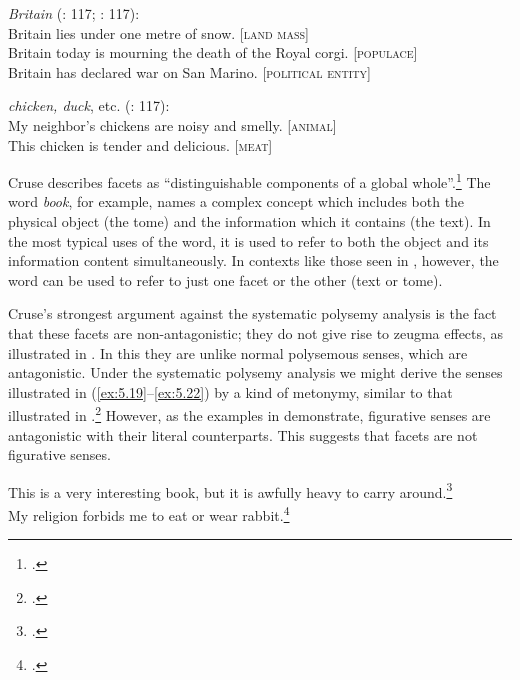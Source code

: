 \ea \label{ex:5.21} \textit{Britain} (\citealt{Cruse2000}: 117; \citealt{CroftCruse2004}: 117):\\
\ea Britain lies under one metre of snow.                    \hfill [\textsc{land mass}] \\
\ex Britain today is mourning the death of the Royal corgi.  \hfill [\textsc{populace}] \\
\ex Britain has declared war on San Marino.                  \hfill [\textsc{political entity}] \\
                       \z
\z

\ea \label{ex:5.22}
\textit{chicken, duck}, etc. (\citealt{CroftCruse2004}: 117):\\
\ea My neighbor’s chickens are noisy and smelly.  \hfill [\textsc{animal}] \\
\ex This chicken is tender and delicious.  \hfill [\textsc{meat}] \\
                       \z
\z


Cruse describes facets as “distinguishable components of a global whole”.\footnote{\citet[116]{CroftCruse2004}.} The word \textit{book}, for example, names a complex concept which includes both the physical object (the tome) and the information which it contains (the text). In the most typical uses of the word, it is used to refer to both the object and its information content simultaneously. In contexts like those seen in , however, the word can be used to refer to just one facet or the other (text or tome).



Cruse’s strongest argument against the systematic polysemy analysis is the fact that these facets are non-antagonistic; they do not give rise to zeugma effects, as illustrated in . In this they are unlike normal polysemous senses, which are antagonistic. Under the systematic polysemy analysis we might derive the senses illustrated in (\ref{ex:5.19}--\ref{ex:5.22}) by a kind of metonymy, similar to that illustrated in .\footnote{\citet{Nunberg1979,Nunberg1995}.} However, as the examples in  demonstrate, figurative senses are antagonistic with their literal counterparts. This suggests that facets are not figurative senses.


\ea \label{ex:5.23}
\ea This is a very interesting book, but it is awfully heavy to carry around.\footnote{\citet{Cruse2004}.} \\
\ex My religion forbids me to eat or wear rabbit.\footnote{\citet{NunbergZaenen1992}.}
                       \z
\z

